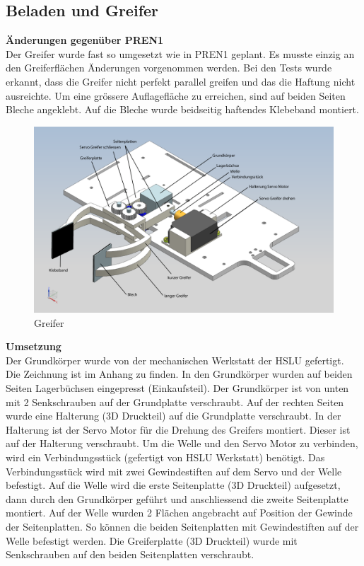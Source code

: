 \newpage
\subsection{Beladen und Greifer}
\textbf{Änderungen gegenüber PREN1}\\[0.2cm]
Der Greifer wurde fast so umgesetzt wie in PREN1 geplant. Es musste einzig an den Greiferflächen Änderungen vorgenommen werden. Bei den Tests wurde erkannt, dass die Greifer nicht perfekt parallel greifen und das die Haftung nicht ausreichte. Um eine grössere Auflagefläche zu erreichen, sind auf beiden Seiten Bleche angeklebt. Auf die Bleche wurde beidseitig haftendes Klebeband montiert.\\[0.2cm]
\begin{figure}[H]
\centering
\includegraphics[width=1\textwidth]{03_Loesungskonzept/pictures/greifer2.png}
\caption{Greifer}
\end{figure}
\textbf{Umsetzung}\\[0.2cm]
Der Grundkörper wurde von der mechanischen Werkstatt der HSLU gefertigt. Die Zeichnung ist im Anhang zu finden. In den Grundkörper wurden auf beiden Seiten Lagerbüchsen eingepresst (Einkaufsteil). Der Grundkörper ist von unten mit 2 Senkschrauben auf der Grundplatte verschraubt.
Auf der rechten Seiten wurde eine Halterung (3D Druckteil) auf die Grundplatte verschraubt. In der Halterung ist der Servo Motor für die Drehung des Greifers montiert. Dieser ist auf der Halterung verschraubt. Um die Welle und den Servo Motor zu verbinden, wird ein Verbindungsstück (gefertigt von HSLU Werkstatt) benötigt. Das Verbindungsstück wird mit zwei Gewindestiften auf dem Servo und der Welle befestigt. Auf die Welle wird die erste Seitenplatte (3D Druckteil) aufgesetzt, dann durch den Grundkörper geführt und anschliessend die zweite Seitenplatte montiert. Auf der Welle wurden 2 Flächen angebracht auf Position der Gewinde der Seitenplatten. So können die beiden Seitenplatten mit Gewindestiften auf der Welle befestigt werden. Die Greiferplatte (3D Druckteil) wurde mit Senkschrauben auf den beiden Seitenplatten verschraubt. 
